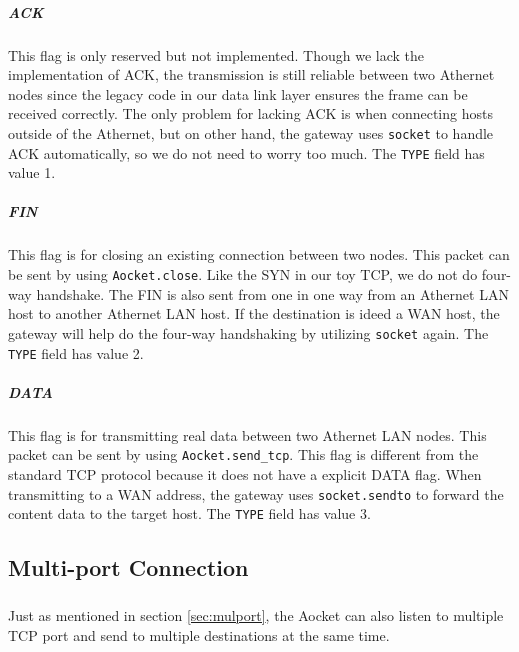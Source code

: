         \subparagraph{ACK}
            This flag is only reserved but not implemented. Though we lack the implementation of ACK, the transmission is still reliable between two Athernet nodes since the legacy code in our data link layer ensures the frame can be received correctly. The only problem for lacking ACK is when connecting hosts outside of the Athernet, but on other hand, the gateway uses {\tt socket} to handle ACK automatically, so we do not need to worry too much. The {\tt TYPE} field has value 1.
        
        \subparagraph{FIN}
            This flag is for closing an existing connection between two nodes. This packet can be sent by using {\tt Aocket.close}. Like the SYN in our toy TCP, we do not do four-way handshake. The FIN is also sent from one in one way from an Athernet LAN host to another Athernet LAN host. If the destination is ideed a WAN host, the gateway will help do the four-way handshaking by utilizing {\tt socket} again. The {\tt TYPE} field has value 2.

        \subparagraph{DATA}
            This flag is for transmitting real data between two Athernet LAN nodes. This packet can be sent by using {\tt Aocket.send\_tcp}. This flag is different from the standard TCP protocol because it does not have a explicit DATA flag. When transmitting to a WAN address, the gateway uses {\tt socket.sendto} to forward the content data to the target host. The {\tt TYPE} field has value 3.

    \subsection{Multi-port Connection}
        \subparagraph{}
        Just as mentioned in section \ref{sec:mulport}, the Aocket can also listen to multiple TCP port and send to multiple destinations at the same time.
